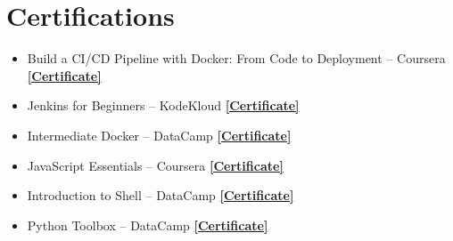 \documentclass[letterpaper,10.5pt]{article}
\begin{document}
\section{Certifications}
\vspace{-12pt}
\begin{footnotesize}
\begin{multicols}{2}
\raggedcolumns
\begin{itemize}[leftmargin=*, itemsep=0pt, topsep=0pt]
  \item Build a CI/CD Pipeline with Docker: From Code to Deployment – Coursera \href{https://coursera.org/share/1e54bd6b8db39e312a29dee614ef8356}{\textbf{[Certificate]}}
  \item Jenkins for Beginners – KodeKloud \href{https://learn.kodekloud.com/certificate/ff1692fe-ca5d-4a82-840d-d5d0a3ecc5c4}{\textbf{[Certificate]}}
  \item Intermediate Docker – DataCamp \href{https://www.datacamp.com/completed/statement-of-accomplishment/course/6ae4cd049c04e9b22d645592be0fccca8c217d0f}{\textbf{[Certificate]}}
  \item JavaScript Essentials – Coursera \href{https://coursera.org/share/8bccd707d35dee412c88211f59ed3804}{\textbf{[Certificate]}}
  \item Introduction to Shell – DataCamp \href{https://www.datacamp.com/completed/statement-of-accomplishment/course/a29d7044c4829a508e6379d543592ae27df0c494}{\textbf{[Certificate]}}
  \item Python Toolbox – DataCamp \href{https://www.datacamp.com/completed/statement-of-accomplishment/course/60b1bb72f84282e49fa521aeec0b5dd27a260775}{\textbf{[Certificate]}}
\end{itemize}
\end{multicols}
\end{footnotesize}
\end{document}
